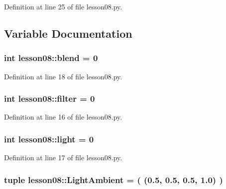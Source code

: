 Definition at line 25 of file lesson08.py.

\subsection{Variable Documentation}
\subsubsection{\setlength{\rightskip}{0pt plus 5cm}int {\bf lesson08::blend} = 0\hspace{0.3cm}{\tt  [static]}}\label{namespacelesson08_2885e4ec18c0200378977525ea701225}




Definition at line 18 of file lesson08.py.
\subsubsection{\setlength{\rightskip}{0pt plus 5cm}int {\bf lesson08::filter} = 0\hspace{0.3cm}{\tt  [static]}}\label{namespacelesson08_37979d2cd5f9e0a892c8b76c525adb1d}




Definition at line 16 of file lesson08.py.
\subsubsection{\setlength{\rightskip}{0pt plus 5cm}int {\bf lesson08::light} = 0\hspace{0.3cm}{\tt  [static]}}\label{namespacelesson08_cbe9380f8fd7844103d386ef8dd09b98}




Definition at line 17 of file lesson08.py.
\subsubsection{\setlength{\rightskip}{0pt plus 5cm}tuple {\bf lesson08::LightAmbient} = ( (0.5, 0.5, 0.5, 1.0) )\hspace{0.3cm}{\tt  [static]}}\label{namespacelesson08_a4cbcac4828b0bb75166a2b06cb563f1}




